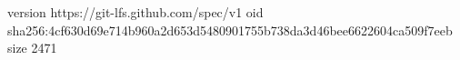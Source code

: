 version https://git-lfs.github.com/spec/v1
oid sha256:4cf630d69e714b960a2d653d5480901755b738da3d46bee6622604ca509f7eeb
size 2471
